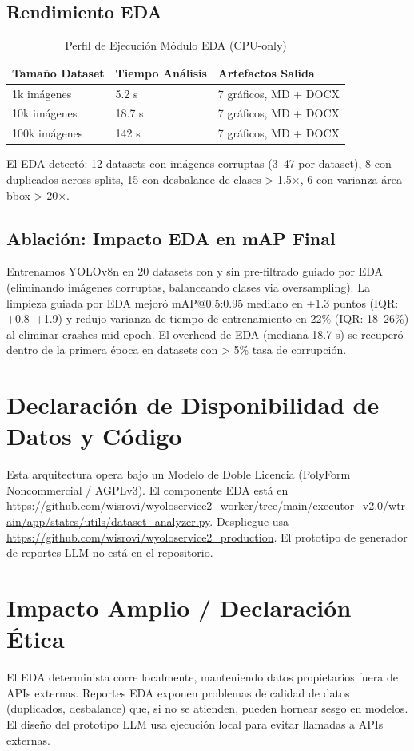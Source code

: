 \documentclass[10pt,twocolumn,letterpaper]{article}
\begin{document}
\subsection{Rendimiento EDA}
\begin{table}[htbp]
\centering
\caption{Perfil de Ejecución Módulo EDA (CPU-only)}
\label{tab:eda_perf}
\begin{tabular}{@{}lll@{}}
\toprule
Tamaño Dataset & Tiempo Análisis & Artefactos Salida \\ \midrule
1k imágenes & 5.2 s & 7 gráficos, MD + DOCX \\
10k imágenes & 18.7 s & 7 gráficos, MD + DOCX \\
100k imágenes & 142 s & 7 gráficos, MD + DOCX \\ \bottomrule
\end{tabular}
\end{table}

El EDA detectó: 12 datasets con imágenes corruptas (3--47 por dataset), 8 con duplicados across splits, 15 con desbalance de clases > 1.5$\times$, 6 con varianza área bbox > 20$\times$.

\subsection{Ablación: Impacto EDA en mAP Final}
Entrenamos YOLOv8n en 20 datasets con y sin pre-filtrado guiado por EDA (eliminando imágenes corruptas, balanceando clases via oversampling). La limpieza guiada por EDA mejoró mAP@0.5:0.95 mediano en +1.3 puntos (IQR: +0.8--+1.9) y redujo varianza de tiempo de entrenamiento en 22\% (IQR: 18--26\%) al eliminar crashes mid-epoch. El overhead de EDA (mediana 18.7 s) se recuperó dentro de la primera época en datasets con > 5\% tasa de corrupción.

\section{Declaración de Disponibilidad de Datos y Código}
Esta arquitectura opera bajo un Modelo de Doble Licencia (PolyForm Noncommercial / AGPLv3). El componente EDA está en \url{https://github.com/wisrovi/wyoloservice2_worker/tree/main/executor_v2.0/wtrain/app/states/utils/dataset_analyzer.py}. Despliegue usa \url{https://github.com/wisrovi/wyoloservice2_production}. El prototipo de generador de reportes LLM no está en el repositorio.

\section{Impacto Amplio / Declaración Ética}
El EDA determinista corre localmente, manteniendo datos propietarios fuera de APIs externas. Reportes EDA exponen problemas de calidad de datos (duplicados, desbalance) que, si no se atienden, pueden hornear sesgo en modelos. El diseño del prototipo LLM usa ejecución local para evitar llamadas a APIs externas.
\end{document}

